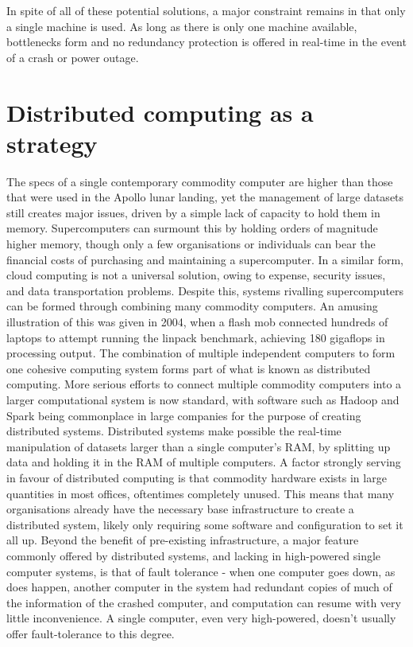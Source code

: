 \documentclass[a4paper,10pt]{article}
\begin{document}
In spite of all of these potential solutions, a major constraint remains in that only a single machine is used.
As long as there is only one machine available, bottlenecks form and no redundancy protection is offered in real-time in the event of a crash or power outage.

\section{Distributed computing as a strategy}
\label{dist}
The specs of a single contemporary commodity computer are higher than those that were used in the Apollo lunar landing, yet the management of large datasets still creates major issues, driven by a simple lack of  capacity to hold them in memory.
Supercomputers can surmount this by holding orders of magnitude higher memory, though only a few organisations or individuals can bear the financial costs of purchasing and maintaining a supercomputer. 
In a similar form, cloud computing is not a universal solution, owing to expense, security issues, and data transportation problems.
Despite this, systems rivalling supercomputers can be formed through combining many commodity computers.
An amusing illustration of this was given in 2004, when a flash mob connected hundreds of laptops to attempt running the linpack benchmark, achieving 180 gigaflops in processing output\cite{perry2004flashcomp}.
The combination of multiple independent computers to form one cohesive computing system forms part of what is known as distributed computing.
More serious efforts to connect multiple commodity computers into a larger computational system is now standard, with software such as Hadoop and Spark being commonplace in large companies for the purpose of creating distributed systems.
Distributed systems make possible the real-time manipulation of datasets larger than a single computer's RAM, by splitting up data and holding it in the RAM of multiple computers.
A factor strongly serving in favour of distributed computing is that commodity hardware exists in large quantities in most offices, oftentimes completely unused.
This means that many organisations already have the necessary base infrastructure to create a distributed system, likely only requiring some software and configuration to set it all up.
Beyond the benefit of pre-existing infrastructure, a major feature commonly offered by distributed systems, and lacking in high-powered single computer systems, is that of fault tolerance - when one computer goes down, as does happen, another computer in the system had redundant copies of much of the information of the crashed computer, and computation can resume with very little inconvenience.
A single computer, even very high-powered, doesn't usually offer fault-tolerance to this degree.
\end{document}
